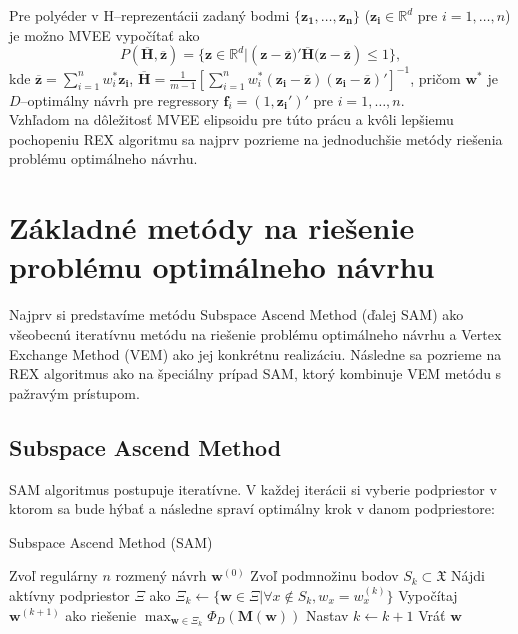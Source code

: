 Pre polyéder v H--reprezentácii zadaný bodmi $\{ \mathbf{z_1, \dots, z_n} \}$ ($\mathbf{z_i} \in \mathbb{R}^d$ pre $i=1,\dots, n$) je možno MVEE vypočítať ako $$P(\mathbf{\overline H, \overline z})= \{ \mathbf{z} \in \mathbb{R}^d | (\mathbf{z-\overline z)'\overline H(z-\overline z}) \le 1 \}, $$ kde $\mathbf{\overline z}=\sum_{i=1}^n w_i^*\mathbf{z_i}$, $\mathbf{\overline H}=\frac{1}{m-1} \left[ \sum_{i=1}^n w_i^*\mathbf{(z_i-\overline z)(z_i-\overline z)'} \right]^{-1} $, pričom $\mathbf{w^*}$ je $D$--optimálny návrh pre regressory $\mathbf{f}_i=(1,\mathbf{z_i}')'$ pre $i=1,\dots, n$.\\

Vzhľadom na dôležitosť MVEE elipsoidu pre túto prácu a kvôli lepšiemu pochopeniu REX algoritmu sa najprv pozrieme na jednoduchšie metódy riešenia problému optimálneho návrhu.

\section{Základné metódy na riešenie problému optimálneho návrhu}

Najprv si predstavíme metódu Subspace Ascend Method (ďalej SAM) ako všeobecnú iteratívnu metódu na riešenie problému optimálneho návrhu a Vertex Exchange Method (VEM) ako jej konkrétnu realizáciu. Následne sa pozrieme na REX algoritmus ako na špeciálny prípad SAM, ktorý kombinuje VEM metódu s pažravým prístupom.

\subsection{Subspace Ascend Method}

SAM algoritmus postupuje iteratívne. V každej iterácii si vyberie podpriestor v ktorom sa bude hýbať a následne spraví optimálny krok v danom podpriestore:

\begin{algorithm}[H]
	\caption{Subspace Ascend Method (SAM) \cite{rex_harman}}
	\label{sam}
	\begin{algorithmic}[1]
		\State Zvoľ regulárny $n$ rozmený návrh $\mathbf w^{(0)}$
			\State Zvoľ podmnožinu bodov $S_k \subset \mathfrak X$
			\State Nájdi aktívny podpriestor $\Xi$ ako $\Xi_k \leftarrow \{ \mathbf w \in \Xi | \forall x \not \in S_k, w_x = w_x^{(k)} \}$
			\State Vypočítaj $\mathbf w^{(k+1)}$ ako riešenie $\max_{\mathbf w \in \Xi_k} \Phi_D(\mathbf{M(w)})$ 
			\State Nastav $k \leftarrow k+1$
		\EndWhile
		\State Vráť $\mathbf w$
	\end{algorithmic}
\end{algorithm}

